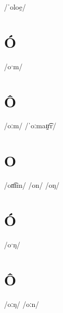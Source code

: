 \documentclass[10pt,a4paper,twoside]{book}
\begin{document}
\begin{multicols}{3}
 {/ˈoloe̯/} {}
\end{multicols}

\section*{Ó}

\begin{multicols}{3}
 {/oˑm/} {}
\end{multicols}

\section*{Ô}

\begin{multicols}{3}
 {/oːm/} {}
 {/ˈoːmaɪ̯r͡r/} {}
\end{multicols}

\section*{O}

\begin{multicols}{3}
 {/om͡m/} {}
 {/on/} {}
 {/oŋ/} {}
\end{multicols}

\section*{Ó}

\begin{multicols}{3}
 {/oˑŋ/} {}
\end{multicols}

\section*{Ô}

\begin{multicols}{3}
 {/oːŋ/} {}
 {/oːn/} {}
\end{multicols}
\end{document}
